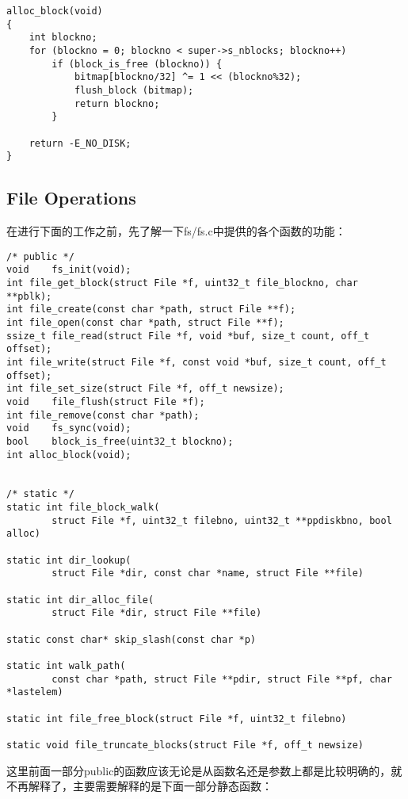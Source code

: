 \documentclass{article}
\begin{document}
\begin{CJK*}{UTF8}{gkai}
\begin{lstlisting}[style=ccode, title={\scriptsize \ttfamily \bfseries fs/fs.c: alloc\_block()}]
alloc_block(void)
{
    int blockno;
    for (blockno = 0; blockno < super->s_nblocks; blockno++)
        if (block_is_free (blockno)) {
            bitmap[blockno/32] ^= 1 << (blockno%32);
            flush_block (bitmap);
            return blockno;
        }
    
    return -E_NO_DISK;
}
\end{lstlisting}

\subsection{File Operations}


在进行下面的工作之前，先了解一下fs/fs.c中提供的各个函数的功能：

\begin{lstlisting}[style=ccode, title={\scriptsize \ttfamily \bfseries fs/fs.c}]
/* public */
void	fs_init(void);
int	file_get_block(struct File *f, uint32_t file_blockno, char **pblk);
int	file_create(const char *path, struct File **f);
int	file_open(const char *path, struct File **f);
ssize_t	file_read(struct File *f, void *buf, size_t count, off_t offset);
int	file_write(struct File *f, const void *buf, size_t count, off_t offset);
int	file_set_size(struct File *f, off_t newsize);
void	file_flush(struct File *f);
int	file_remove(const char *path);
void	fs_sync(void);
bool	block_is_free(uint32_t blockno);
int	alloc_block(void);


/* static */
static int file_block_walk(
        struct File *f, uint32_t filebno, uint32_t **ppdiskbno, bool alloc)

static int dir_lookup(
        struct File *dir, const char *name, struct File **file)

static int dir_alloc_file(
        struct File *dir, struct File **file)
        
static const char* skip_slash(const char *p)

static int walk_path(
        const char *path, struct File **pdir, struct File **pf, char *lastelem)
        
static int file_free_block(struct File *f, uint32_t filebno)

static void file_truncate_blocks(struct File *f, off_t newsize)

\end{lstlisting}

这里前面一部分public的函数应该无论是从函数名还是参数上都是比较明确的，就不再解释了，主要需要解释的是下面一部分静态函数：


\end{CJK*}
\end{document}
